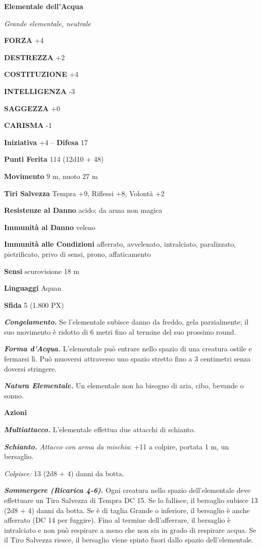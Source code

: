 \begin{multicols}{2}
\medskip{}\textbf{Elementale dell'Acqua}

\textit{Grande elementale, neutrale}

\textbf{FORZA} +4

\textbf{DESTREZZA} +2

\textbf{COSTITUZIONE} +4

\textbf{INTELLIGENZA} -3

\textbf{SAGGEZZA} +0

\textbf{CARISMA} -1

\textbf{Iniziativa} +4 -- \textbf{Difesa} 17

\textbf{Punti Ferita} 114 (12d10 + 48)

\textbf{Movimento} 9 m, nuoto 27 m

\textbf{Tiri Salvezza} Tempra +9, Riflessi +8, Volontà +2

\textbf{Resistenze al Danno} acido; da arma non magica

\textbf{Immunità al Danno} veleno

\textbf{Immunità alle Condizioni} afferrato, avvelenato, intralciato, paralizzato, pietrificato, privo di sensi, prono, affaticamento

\textbf{Sensi} scurovisione 18 m

\textbf{Linguaggi} Aquan

\textbf{Sfida} 5 (1.800 PX)

\textit{\textbf{Congelamento.}} Se l'elementale subisce danno da freddo, gela parzialmente; il suo movimento è ridotto di 6 metri fino al termine del suo prossimo round.

\textit{\textbf{Forma d'Acqua.}} L'elementale può entrare nello spazio di una creatura ostile e fermarsi lì. Può muoversi attraverso uno spazio stretto fino a 3 centimetri senza doversi stringere.

\textit{\textbf{Natura Elementale.}} Un elementale non ha bisogno di aria,
cibo, bevande o sonno.

\textbf{Azioni}

\textit{\textbf{Multiattacco.}} L'elementale effettua due attacchi di schianto.

\textit{\textbf{Schianto.} Attacco con arma da mischia}: +11 a colpire, portata 1 m, un bersaglio.

\textit{Colpisce:} 13 (2d8 + 4) danni da botta.

\textit{\textbf{Sommergere (Ricarica 4-6).}} Ogni creatura nello spazio dell'elementale deve effettuare un Tiro Salvezza di Tempra DC 15. Se lo fallisce, il bersaglio subisce 13 (2d8 + 4) danni da botta. Se è di taglia Grande o inferiore, il bersaglio è anche afferrato (DC 14 per fuggire). Fino al termine dell'afferrare, il bersaglio è intralciato e non può respirare a meno che non sia in grado di respirare acqua. Se il Tiro Salvezza riesce, il bersaglio viene spinto fuori dallo spazio
dell'elementale.


\end{multicols}
